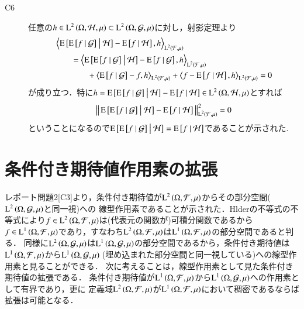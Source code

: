 \begin{prf}
\begin{description}
			\item[C6] 任意の$h \in \operatorname{L}^{2} \left(\Omega, \mathcal{H},\mu\right) \subset \operatorname{L}^{2} \left(\Omega, \mathcal{G},\mu\right)$に対し，射影定理より
				\begin{align}
					&\inprod<\cexp{\cexp{f}{\mathcal{G}}}{\mathcal{H}} - \cexp{f}{\mathcal{H}}, h>_{\Lp{2}{\mathcal{F},\mu}} \\
					&\qquad = \inprod<\cexp{\cexp{f}{\mathcal{G}}}{\mathcal{H}} - \cexp{f}{\mathcal{G}}, h>_{\Lp{2}{\mathcal{F},\mu}} \\
						&\qquad \qquad + \inprod<\cexp{f}{\mathcal{G}} - f, h>_{\Lp{2}{\mathcal{F},\mu}} + \inprod<f - \cexp{f}{\mathcal{H}}, h>_{\Lp{2}{\mathcal{F},\mu}}
					= 0
				\end{align}
				が成り立つ．特に$h = \operatorname{E} \left[ \operatorname{E} \left[ f \ \middle|\ \mathcal{G} \right] \ \middle|\ \mathcal{H} \right] - \operatorname{E} \left[ f \ \middle|\ \mathcal{H} \right] \in \operatorname{L}^{2} \left(\Omega, \mathcal{H},\mu\right)$とすれば
				\begin{align}
					\left\|\, \operatorname{E} \left[ \operatorname{E} \left[ f \ \middle|\ \mathcal{G} \right] \ \middle|\ \mathcal{H} \right] - \operatorname{E} \left[ f \ \middle|\ \mathcal{H} \right]\, \right\|_{\operatorname{L}^{2} \left(\mathcal{F},\mu\right)}^2 = 0
				\end{align}
				ということになるので$\operatorname{E} \left[ \operatorname{E} \left[ f \ \middle|\ \mathcal{G} \right] \ \middle|\ \mathcal{H} \right] = \operatorname{E} \left[ f \ \middle|\ \mathcal{H} \right]$であることが示された.
		\end{description}
		\QED
	\end{prf}
	
\section{条件付き期待値作用素の拡張}
	レポート問題2[C3]より，条件付き期待値が$\operatorname{L}^{2} \left(\Omega,\mathcal{F},\mu\right)$からその部分空間($\operatorname{L}^{2} \left(\Omega,\mathcal{G},\mu\right)$と同一視)への
	線型作用素であることが示された．Hlderの不等式の不等式により$f \in \operatorname{L}^{2} \left(\Omega,\mathcal{F},\mu\right)$は(代表元の関数が)可積分関数であるから
	$f \in \operatorname{L}^{1} \left(\Omega,\mathcal{F},\mu\right)$であり，すなわち$\operatorname{L}^{2} \left(\Omega,\mathcal{F},\mu\right)$は$\operatorname{L}^{1} \left(\Omega,\mathcal{F},\mu\right)$の部分空間であると判る．
	同様に$\operatorname{L}^{2} \left(\Omega,\mathcal{G},\mu\right)$は$\operatorname{L}^{1} \left(\Omega,\mathcal{G},\mu\right)$の部分空間であるから，条件付き期待値は
	$\operatorname{L}^{1} \left(\Omega,\mathcal{F},\mu\right)$から$\Lp{1}{\Omega,\mathcal{G},\mu}\ $(埋め込まれた部分空間と同一視している)への線型作用素と見ることができる．
	次に考えることは，線型作用素として見た条件付き期待値の拡張である．
	条件付き期待値が$\operatorname{L}^{1} \left(\Omega,\mathcal{F},\mu\right)$から$\operatorname{L}^{1} \left(\Omega,\mathcal{G},\mu\right)$への作用素として有界であり，更に
	定義域$\operatorname{L}^{2} \left(\Omega,\mathcal{F},\mu\right)$が$\operatorname{L}^{1} \left(\Omega,\mathcal{F},\mu\right)$において稠密であるならば拡張は可能となる．
	

